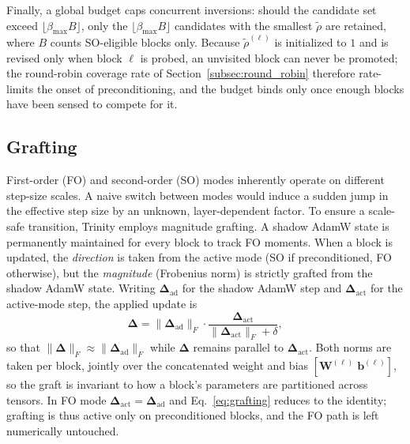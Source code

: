 \documentclass[conference]{IEEEtran}
\begin{document}
Finally, a global budget caps concurrent inversions: should the candidate set exceed $\lfloor \beta_{\mathrm{max}} B \rfloor$, only the $\lfloor \beta_{\mathrm{max}} B \rfloor$ candidates with the smallest $\tilde{\rho}$ are retained, where $B$ counts SO-eligible blocks only. Because $\tilde{\rho}^{(\ell)}$ is initialized to $1$ and is revised only when block $\ell$ is probed, an unvisited block can never be promoted; the round-robin coverage rate of Section~\ref{subsec:round_robin} therefore rate-limits the onset of preconditioning, and the budget binds only once enough blocks have been sensed to compete for it.

\subsection{Grafting}
\label{subsec:grafting}
First-order (FO) and second-order (SO) modes inherently operate on different step-size scales. A naive switch between modes would induce a sudden jump in the effective step size by an unknown, layer-dependent factor. To ensure a scale-safe transition, Trinity employs magnitude grafting. A shadow AdamW state is permanently maintained for every block to track FO moments. When a block is updated, the \textit{direction} is taken from the active mode (SO if preconditioned, FO otherwise), but the \textit{magnitude} (Frobenius norm) is strictly grafted from the shadow AdamW state. Writing $\boldsymbol{\Delta}_{\mathrm{ad}}$ for the shadow AdamW step and $\boldsymbol{\Delta}_{\mathrm{act}}$ for the active-mode step, the applied update is
\begin{equation}
\boldsymbol{\Delta} = \|\boldsymbol{\Delta}_{\mathrm{ad}}\|_F \cdot \frac{\boldsymbol{\Delta}_{\mathrm{act}}}{\|\boldsymbol{\Delta}_{\mathrm{act}}\|_F + \delta},
\label{eq:grafting}
\end{equation}
so that $\|\boldsymbol{\Delta}\|_F \approx \|\boldsymbol{\Delta}_{\mathrm{ad}}\|_F$ while $\boldsymbol{\Delta}$ remains parallel to $\boldsymbol{\Delta}_{\mathrm{act}}$. Both norms are taken per block, jointly over the concatenated weight and bias $[\mathbf{W}^{(\ell)}\;\mathbf{b}^{(\ell)}]$, so the graft is invariant to how a block's parameters are partitioned across tensors. In FO mode $\boldsymbol{\Delta}_{\mathrm{act}} = \boldsymbol{\Delta}_{\mathrm{ad}}$ and Eq.~\eqref{eq:grafting} reduces to the identity; grafting is thus active only on preconditioned blocks, and the FO path is left numerically untouched.
\end{document}
